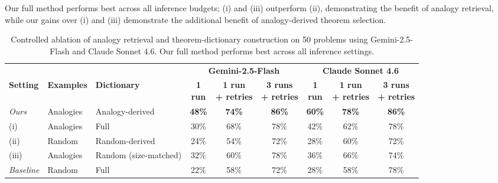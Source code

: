 Our full method performs best across all inference budgets; (i) and (iii) outperform (ii), demonstrating the benefit of analogy retrieval, while our gains over (i) and (iii) demonstrate the additional benefit of analogy-derived theorem selection.



\begin{table}[t]
\centering
\setlength{\tabcolsep}{3.5pt}
\begin{tabular}{lll@{\hspace{7pt}}ccc@{\hspace{9pt}}ccc}
\toprule
& & 
& \multicolumn{3}{c}{\textbf{Gemini-2.5-Flash}}
& \multicolumn{3}{c}{\textbf{Claude Sonnet 4.6}} \\
\cmidrule(lr){4-6} \cmidrule(lr){7-9}

\textbf{Setting} &
\textbf{Examples} &
\textbf{Dictionary} &
\shortstack{\textbf{1}\\\textbf{run}} &
\shortstack{\textbf{1 run}\\\textbf{+ retries}} &
\shortstack{\textbf{3 runs}\\\textbf{+ retries}} &
\shortstack{\textbf{1}\\\textbf{run}} &
\shortstack{\textbf{1 run}\\\textbf{+ retries}} &
\shortstack{\textbf{3 runs}\\\textbf{+ retries}} \\
\midrule

\textit{Ours} 
& Analogies 
& Analogy-derived 
& \textbf{48\%} & \textbf{74\%} & \textbf{86\%}
& \textbf{60\%} & \textbf{78\%} & \textbf{86\%} \\

(i) 
& Analogies 
& Full 
& 30\% & 68\% & 78\%
& 42\% & 62\% & 78\% \\

(ii) 
& Random 
& Random-derived
& 24\% & 54\% & 72\%
& 28\% & 60\% & 72\% \\

(iii) 
& Analogies 
& Random (size-matched)
& 32\% & 60\% & 78\%
& 36\% & 66\% & 74\% \\

\textit{Baseline} 
& Random 
& Full
& 22\% & 58\% & 72\%
& 28\% & 58\% & 78\% \\

\bottomrule
\end{tabular}

\caption{Controlled ablation of analogy retrieval and theorem-dictionary construction on 50 problems using Gemini-2.5-Flash and Claude Sonnet 4.6. Our full method performs best across all inference settings.}
\label{tab:ablation_dict}
\end{table}





